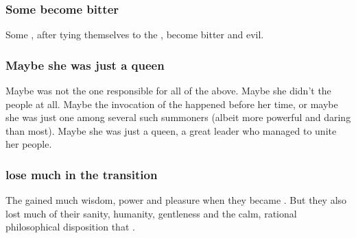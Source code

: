 \subsubsection{Some \Draecchonosh{} become bitter}
Some \draecchonosh, after tying themselves to the \xss, become bitter and evil. 






\subsubsection{Maybe she was just a queen}
Maybe \Kserasshana{} was not the one responsible for all of the above. 
Maybe she didn't  the \dzraicchenoss{} people at all.
Maybe the invocation of the \xss{} happened before her time, or maybe she was just one among several such summoners (albeit more powerful and daring than most). 
Maybe she was just a queen, a great leader who managed to unite her people. 





\subsubsection{\Dragons lose much in the transition}
The \dragons gained much wisdom, power and pleasure when they became \dragons. 
But they also lost much of their sanity, humanity, gentleness and the calm, rational philosophical disposition that . 

